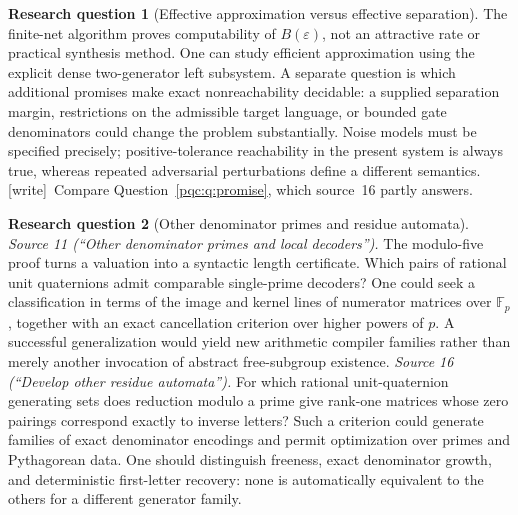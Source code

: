 \documentclass[11pt,letterpaper]{article}
\numberwithin{equation}{section}
\theoremstyle{definition}
\newtheorem{question}{Research question}
\theoremstyle{remark}
\newcommand{\wtag}{\textup{[write]}}
\newcommand{\eps}{\varepsilon}
\newcommand{\F}{\mathbb F}
\begin{document}
\begin{question}[Effective approximation versus effective separation]
\label{pqc:rr:q:approx}
The finite-net algorithm proves computability of $B(\eps)$, not an
attractive rate or practical synthesis method. One can study efficient
approximation using the explicit dense two-generator left subsystem.
A separate question is which additional promises make exact
nonreachability decidable: a supplied separation margin, restrictions on
the admissible target language, or bounded gate denominators could change
the problem substantially. Noise models must be specified precisely;
positive-tolerance reachability in the present system is always true,
whereas repeated adversarial perturbations define a different semantics.
\wtag\ Compare Question~\ref{pqc:q:promise}, which source~16 partly answers.
\end{question}

\begin{question}[Other denominator primes and residue automata]
\label{pqc:rr:q:primes}\label{pqc:dr:q:residue}
\emph{Source 11 (``Other denominator primes and local decoders'').}
The modulo-five proof turns a valuation into a syntactic length
certificate. Which pairs of rational unit quaternions admit comparable
single-prime decoders? One could seek a classification in terms of the
image and kernel lines of numerator matrices over $\F_p$, together with
an exact cancellation criterion over higher powers of $p$. A successful
generalization would yield new arithmetic compiler families rather than
merely another invocation of abstract free-subgroup existence.
\emph{Source 16 (``Develop other residue automata'').}
For which rational unit-quaternion generating sets does reduction modulo
a prime give rank-one matrices whose zero pairings correspond exactly to
inverse letters? Such a criterion could generate families of exact
denominator encodings and permit optimization over primes and
Pythagorean data. One should distinguish freeness, exact denominator
growth, and deterministic first-letter recovery: none is automatically
equivalent to the others for a different generator family.
\end{question}
\end{document}
